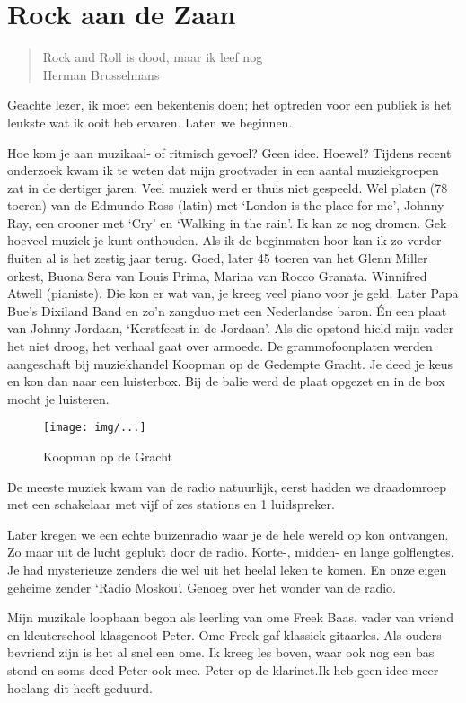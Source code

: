 \documentclass[10pt,twoside,openright]{memoir}
\begin{document}
\part{Rock aan de Zaan}

\begin{quote}
Rock and Roll is dood, maar ik leef nog \\
Herman Brusselmans
\end{quote}

Geachte lezer, ik moet een bekentenis doen; het optreden voor een publiek is het leukste wat ik ooit heb ervaren. Laten we beginnen.

Hoe kom je aan muzikaal- of ritmisch gevoel? Geen idee. Hoewel? Tijdens recent onderzoek kwam ik te weten dat mijn grootvader in een aantal muziekgroepen zat in de dertiger jaren. Veel muziek werd er thuis niet gespeeld. Wel platen (78 toeren) van de Edmundo Ross (latin) met ‘London is the place for me’, Johnny Ray, een crooner met ‘Cry’ en ‘Walking in the rain’. Ik kan ze nog dromen. Gek hoeveel muziek je kunt onthouden. Als ik de beginmaten hoor kan ik zo verder fluiten al is het zestig jaar terug. Goed, later 45 toeren van het Glenn Miller orkest, Buona Sera van Louis Prima, Marina van Rocco Granata. Winnifred Atwell (pianiste). Die kon er wat van, je kreeg veel piano voor je geld. Later Papa Bue’s Dixiland Band en zo’n zangduo met een Nederlandse baron. Én een plaat van Johnny Jordaan, ‘Kerstfeest in de Jordaan’. Als die opstond hield mijn vader het niet droog, het verhaal gaat over armoede. De grammofoonplaten werden aangeschaft bij muziekhandel Koopman op de Gedempte Gracht. Je deed je keus en kon dan naar een luisterbox. Bij de balie werd de plaat opgezet en in de box mocht je luisteren. 

\begin{figure}[t]
\texttt{[image: img/...]}
\caption{Koopman op de Gracht}
\end{figure}

De meeste muziek kwam van de radio natuurlijk, eerst hadden we draadomroep met een schakelaar met vijf of zes stations en 1 luidspreker. 

Later kregen we een echte buizenradio waar je de hele wereld op kon ontvangen. Zo maar uit de lucht geplukt door de radio. Korte-, midden- en lange golflengtes. Je had mysterieuze zenders die wel uit het heelal leken te komen. En onze eigen geheime zender ‘Radio Moskou’. Genoeg over het wonder van de radio.

Mijn muzikale loopbaan begon als leerling van ome Freek Baas, vader van vriend en kleuterschool klasgenoot Peter. Ome Freek gaf klassiek gitaarles. Als ouders bevriend zijn is het al snel een ome. Ik kreeg les boven, waar ook nog een bas stond en soms deed Peter ook mee. Peter op de klarinet.Ik heb geen idee meer hoelang dit heeft geduurd. 
\end{document}
